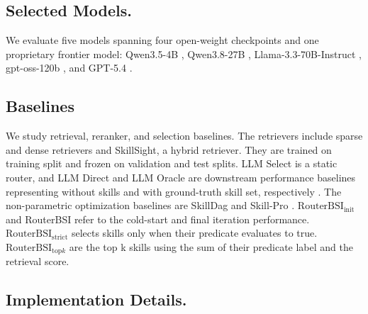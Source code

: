 \begin{archivedtables}[!t]\end{archivedtables}

\subsection{Selected Models.}

We evaluate five models spanning four open-weight checkpoints and one proprietary frontier model: Qwen3.5-4B \citep{qwen2026qwen35}, Qwen3.8-27B \citep{qwen2026qwen38}, Llama-3.3-70B-Instruct \citep{meta2024llama33}, gpt-oss-120b \citep{openai2025gptoss}, and GPT-5.4 \citep{openai2026gpt54}.

\subsection{Baselines}

We study retrieval, reranker, and selection baselines. The retrievers include sparse and dense retrievers \citep{su2026skillretrieval} and SkillSight, a hybrid retriever. They are trained on training split and frozen on validation and test splits. LLM Select is a static router, and LLM Direct and LLM Oracle are downstream performance baselines representing without skills and with ground-truth skill set, respectively \citep{su2026skillretrieval}. The non-parametric optimization baselines are SkillDag and Skill-Pro \citep{pmlr-v306-mi26d,bai2026skilldag}. $\mathrm{RouterBSI}_{\mathrm{init}}$ and RouterBSI refer to the cold-start and final iteration performance. $\mathrm{RouterBSI}_{\mathrm{strict}}$ selects skills only when their predicate evaluates to true. $\mathrm{RouterBSI}_{\mathrm{top}k}$ are the top k skills using the sum of their predicate label and the retrieval score.

\subsection{Implementation Details.}

